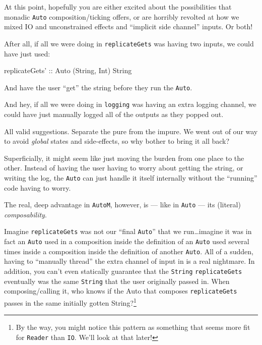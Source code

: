 \documentclass[]{article}
\newenvironment{Shaded}{}{}
\newcommand{\DataTypeTok}[1]{\textcolor[rgb]{0.56,0.13,0.00}{#1}}
\newcommand{\NormalTok}[1]{#1}
\newcommand{\OtherTok}[1]{\textcolor[rgb]{0.00,0.44,0.13}{#1}}
\begin{document}
At this point, hopefully you are either excited about the possibilities that
monadic \texttt{Auto} composition/ticking offers, or are horribly revolted at
how we mixed IO and unconstrained effects and ``implicit side channel'' inputs.
Or both!

After all, if all we were doing in \texttt{replicateGets} was having two inputs,
we could have just used:

\begin{Shaded}
\begin{Highlighting}[]
\OtherTok{replicateGets' ::} \DataTypeTok{Auto}\NormalTok{ (}\DataTypeTok{String}\NormalTok{, }\DataTypeTok{Int}\NormalTok{) }\DataTypeTok{String}
\end{Highlighting}
\end{Shaded}

And have the user ``get'' the string before they run the \texttt{Auto}.

And hey, if all we were doing in \texttt{logging} was having an extra logging
channel, we could have just manually logged all of the outputs as they popped
out.

All valid suggestions. Separate the pure from the impure. We went out of our way
to avoid \emph{global} states and side-effects, so why bother to bring it all
back?

Superficially, it might seem like just moving the burden from one place to the
other. Instead of having the user having to worry about getting the string, or
writing the log, the \texttt{Auto} can just handle it itself internally without
the ``running'' code having to worry.

The real, deep advantage in \texttt{AutoM}, however, is --- like in
\texttt{Auto} --- its (literal) \emph{composability}.

Imagine \texttt{replicateGets\textquotesingle{}} was not our ``final
\texttt{Auto}'' that we run\ldots{}imagine it was in fact an \texttt{Auto} used
in a composition inside the definition of an \texttt{Auto} used several times
inside a composition inside the definition of another \texttt{Auto}. All of a
sudden, having to ``manually thread'' the extra channel of input in is a real
nightmare. In addition, you can't even statically guarantee that the
\texttt{String} \texttt{replicateGets} eventually was the same \texttt{String}
that the user originally passed in. When composing/calling it, who knows if the
Auto that composes \texttt{replicateGets\textquotesingle{}} passes in the same
initially gotten String?\footnote{By the way, you might notice this pattern as
  something that seems more fit for \texttt{Reader} than \texttt{IO}. We'll look
  at that later!}
\end{document}
